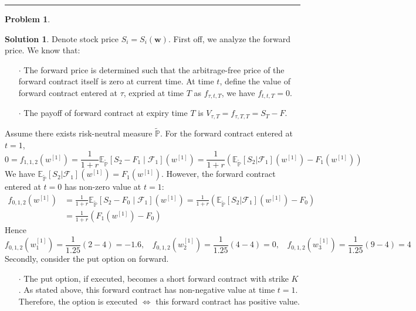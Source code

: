 \documentclass[a4paper, 10pt]{article}
\theoremstyle{definition}
\newtheorem{problem}{Problem}
\theoremstyle{hSol}
\newtheorem*{solution}{Solution}
\begin{document}
\noindent\rule{16cm}{0.4pt}
\begin{problem} 
\end{problem}
\begin{solution} Denote stock price $S_i=S_i(\bm{w})$. First off, we analyze the forward price. We know that:
\begin{itemize}
	\item[$\cdot$] The forward price is determined such that the arbitrage-free price of the forward contract itself is zero at current time. At time $t$, define the value of forward contract entered at $\tau$, expried at time $T$ as $f_{\tau, t, T}$, we have $f_{t, t, T} = 0$.
	\item[$\cdot$] The payoff of forward contract at expiry time $T$ is $V_{\tau, T} = f_{\tau, T, T} = S_T -F$.
\end{itemize}
Assume there exists risk-neutral measure $\tilde{\mathbb{P}}$. For the forward contract entered at $t=1$,
\begin{equation}
	0= f_{1,1,2}(w^{[1]}) = \frac{1}{1+r}\mathbb{E}_{\tilde{\mathbb{P}}}\left[S_2 - F_1\middle|\mathcal{F}_1\right](w^{[1]}) = \frac{1}{1+r}\left(\mathbb{E}_{\tilde{\mathbb{P}}}\left[S_2|\mathcal{F}_1\right](w^{[1]}) - F_1(w^{[1]})\right)
\end{equation}
We have $\mathbb{E}_{\tilde{\mathbb{P}}}\left[S_2|\mathcal{F}_1\right](w^{[1]}) = F_1(w^{[1]})$. However, the forward contract entered at $t=0$ has non-zero value at $t=1$:
\begin{equation}
	\begin{split}
		f_{0,1,2}(w^{[1]}) &= \frac{1}{1+r}\mathbb{E}_{\tilde{\mathbb{P}}}\left[S_2 - F_0\middle|\mathcal{F}_1\right](w^{[1]}) = \frac{1}{1+r}\left(\mathbb{E}_{\tilde{\mathbb{P}}}\left[S_2|\mathcal{F}_1\right](w^{[1]}) - F_0\right) \\
		&=\frac{1}{1+r}\left(F_1(w^{[1]}) - F_0\right) 
	\end{split}
\end{equation}
Hence
$$
f_{0,1,2}(w^{[1]}_1) =\frac{1}{1.25}(2-4)= -1.6,~~~~f_{0,1,2}(w^{[1]}_2)=\frac{1}{1.25}(4-4) = 0, ~~~~f_{0,1,2}(w^{[1]}_3) =\frac{1}{1.25}(9-4)= 4
$$
Secondly, consider the put option on forward. 
\begin{itemize}
	\item[$\cdot$] The put option, if executed, becomes a short forward contract with strike $K$. As stated above, this forward contract has non-negative value at time $t=1$. Therefore, the option is executed $\iff$ this forward contract has positive value.

\end{itemize}
\end{solution}
\end{document}
